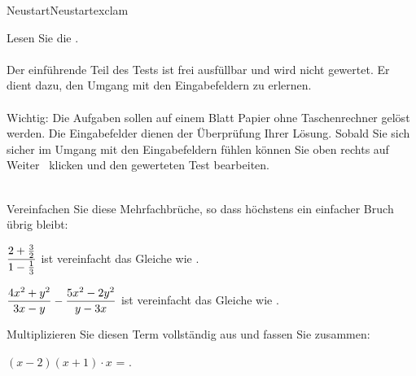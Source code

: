 
\begin{MXContent}{Neustart}{Neustart}{exclam}

Lesen Sie die .
\ \\ \ \\
Der einführende Teil des Tests ist frei ausfüllbar und wird nicht gewertet. Er dient dazu, den Umgang mit den Eingabefeldern zu erlernen.
\ \\ \ \\
Wichtig: Die Aufgaben sollen auf einem Blatt Papier ohne Taschenrechner gelöst werden. Die Eingabefelder dienen der Überprüfung Ihrer Lösung.
Sobald Sie sich sicher im Umgang mit den Eingabefeldern fühlen können Sie oben rechts auf \glqq Weiter \grqq\ klicken und den gewerteten Test bearbeiten.
\ \\ \ \\


\begin{MExercise}
Vereinfachen Sie diese Mehrfachbrüche, so dass höchstens ein einfacher Bruch übrig bleibt:
\begin{MExerciseItems}
\item{$\dfrac{2+\frac32}{1-\frac13}$ ist vereinfacht das Gleiche wie .\\}
\item{$\dfrac{4x^2+y^2}{3x-y}-\dfrac{5x^2-2y^2}{y-3x}$ ist vereinfacht das Gleiche wie .\\}
\end{MExerciseItems}
\end{MExercise}

\begin{MExercise}
Multiplizieren Sie diesen Term vollständig aus und fassen Sie zusammen:

$(x-2)(x+1)\cdot x$ = .


\end{MExercise}
\end{MXContent}
